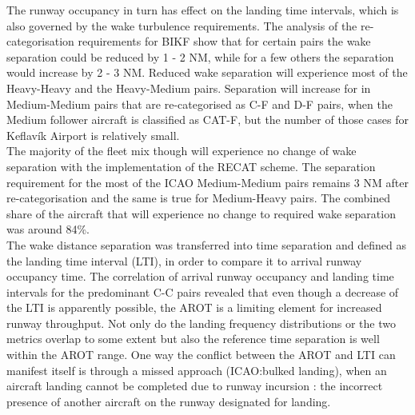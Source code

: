 The runway occupancy in turn has effect on the landing time intervals, which is also governed by the wake turbulence requirements.
The analysis of the re-categorisation requirements for BIKF show that for certain pairs the wake separation could be reduced by 1 - 2 NM, while for a few others the separation would increase by 2 - 3 NM. Reduced wake separation will experience most of the Heavy-Heavy and the Heavy-Medium pairs. Separation will increase for in Medium-Medium pairs that are re-categorised as C-F and D-F pairs, when the Medium follower aircraft is classified as CAT-F, but the number of those cases for Keflavík Airport is relatively small.\\
The majority of the fleet mix though will experience no change of wake separation with the implementation of the RECAT scheme. The separation requirement for the most of the ICAO Medium-Medium pairs remains 3 NM after re-categorisation and the same is true for Medium-Heavy pairs. The combined share of the aircraft that will experience no change to required wake separation was around 84\%. \\
The wake distance separation was transferred into time separation and defined as the landing time interval (LTI), in order to compare it to arrival runway occupancy time.
The correlation of arrival runway occupancy and landing time intervals for the predominant C-C pairs revealed that even though a decrease of the LTI is apparently possible, the AROT is a limiting element for increased runway throughput. Not only do the landing frequency distributions or the two metrics overlap to some extent but also the reference time separation is well within the AROT range. One way the conflict between the AROT and LTI can manifest itself is through a missed approach (ICAO:bulked landing), when an aircraft landing cannot be completed due to runway incursion \cite{doc44444}: the incorrect presence of another aircraft on the runway designated for landing.

